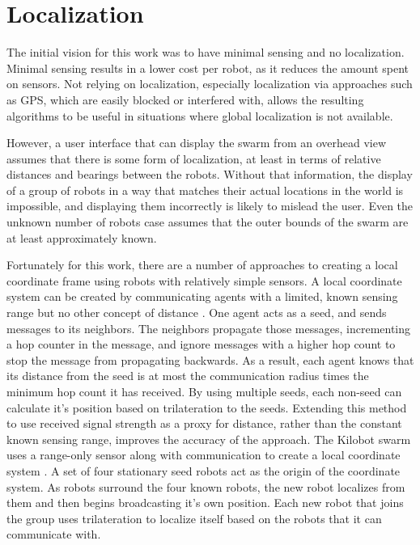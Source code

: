 \section{Localization}\label{sec:localization}

The initial vision for this work was to have minimal sensing and no localization. 
Minimal sensing results in a lower cost per robot, as it reduces the amount spent on sensors. 
Not relying on localization, especially localization via approaches such as GPS, which are easily blocked or interfered with, allows the resulting algorithms to be useful in situations where global localization is not available. 

However, a user interface that can display the swarm from an overhead view assumes that there is some form of localization, at least in terms of relative distances and bearings between the robots.
Without that information, the display of a group of robots in a way that matches their actual locations in the world is impossible, and displaying them incorrectly is likely to mislead the user. 
Even the unknown number of robots case assumes that the outer bounds of the swarm are at least approximately known. 

Fortunately for this work, there are a number of approaches to creating a local coordinate frame using robots with relatively simple sensors. 
A local coordinate system can be created by communicating agents with a limited, known sensing range but no other concept of distance \citep{bachrach2004experimental}.
One agent acts as a seed, and sends messages to its neighbors.
The neighbors propagate those messages, incrementing a hop counter in the message, and ignore messages with a higher hop count to stop the message from propagating backwards. 
As a result, each agent knows that its distance from the seed is at most the communication radius times the minimum hop count it has received. 
By using multiple seeds, each non-seed can calculate it's position based on trilateration to the seeds. 
Extending this method to use received signal strength as a proxy for distance, rather than the constant known sensing range, improves the accuracy of the approach.  
The Kilobot swarm uses a range-only sensor along with communication to create a local coordinate system \citep{Rubenstein795}.
A set of four stationary seed robots act as the origin of the coordinate system. As robots surround the four known robots, the new robot localizes from them and then begins broadcasting it's own position. 
Each new robot that joins the group uses trilateration to localize itself based on the robots that it can communicate with.

